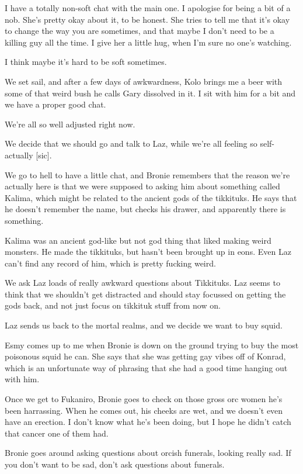 I have a totally non-soft chat with the main one. I apologise for being a bit of a nob. She's pretty okay about it, to be honest. She tries to tell me that it's okay to change the way you are sometimes, and that maybe I don't need to be a killing guy all the time. I give her a little hug, when I'm sure no one's watching.\medskip

I think maybe it's hard to be soft sometimes.\medskip

We set sail, and after a few days of awkwardness, Kolo brings me a beer with some of that weird bush he calls Gary dissolved in it. I sit with him for a bit and we have a proper good chat.\medskip

We're all so well adjusted right now.\medskip

We decide that we should go and talk to Laz, while we're all feeling so self-actually [sic].\medskip

We go to hell to have a little chat, and Bronie remembers that the reason we're actually here is that we were supposed to asking him about something called Kalima, which might be related to the ancient gods of the tikkituks. He says that he doesn't remember the name, but checks his drawer, and apparently there is something.\medskip

Kalima was an ancient god-like but not god thing that liked making weird monsters. He made the tikkituks, but hasn't been brought up in eons. Even Laz can't find any record of him, which is pretty fucking weird.\medskip

We ask Laz loads of really awkward questions about Tikkituks. Laz seems to think that we shouldn't get distracted and should stay focussed on getting the gods back, and not just focus on tikkituk stuff from now on.\medskip

Laz sends us back to the mortal realms, and we decide we want to buy squid.\medskip

Esmy comes up to me when Bronie is down on the ground trying to buy the most poisonous squid he can. She says that she was getting gay vibes off of Konrad, which is an unfortunate way of phrasing that she had a good time hanging out with him.\medskip

Once we get to Fukaniro, Bronie goes to check on those gross orc women he's been harrassing. When he comes out, his cheeks are wet, and we doesn't even have an erection. I don't know what he's been doing, but I hope he didn't catch that cancer one of them had.\medskip

Bronie goes around asking questions about orcish funerals, looking really sad. If you don't want to be sad, don't ask questions about funerals.\medskip


